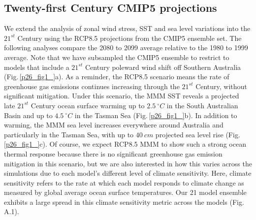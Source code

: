 \documentclass[draft,linenumbers]{agujournal2018}
\begin{document}
\subsection{Twenty-first Century CMIP5 projections}
We extend the analysis of zonal wind stress, SST and sea level variations into the $21^{st}$ Century using the RCP8.5 projections from the CMIP5 ensemble set. The following analyses compare the 2080 to 2099 average relative to the 1980 to 1999 average. Note that we have subsampled the CMIP5 ensemble to restrict to models that include a $21^{st}$ Century poleward wind shift off Southern Australia (Fig.\,\ref{p26_fig1_}a). As a reminder, the RCP8.5 scenario means the rate of greenhouse gas emissions continues increasing through the $21^{st}$ Century, without significant mitigation. Under this scenario, the MMM SST reveals a projected late $21^{st}$ Century ocean surface warming up to $2.5\ ^{\circ}C$ in the South Australian Basin and up to $4.5\ ^{\circ}C$ in the Tasman Sea (Fig.\,\ref{p26_fig1_}b). In addition to warming, the MMM sea level increases everywhere around Australia and particularly in the Tasman Sea, with up to $40\ cm$ projected sea level rise (Fig.\,\ref{p26_fig1_}c). Of course, we expect RCP8.5 MMM to show such a strong ocean thermal response because there is no significant greenhouse gas emission mitigation in this scenario, but we are also interested in how this varies across the simulations due to each model's different level of climate sensitivity. Here, climate sensitivity refers to the rate at which each model responds to climate change as measured by global average ocean surface temperatures. Our 21 model ensemble exhibits a large spread in this climate sensitivity metric across the models (Fig.\,A.1).
\end{document}
